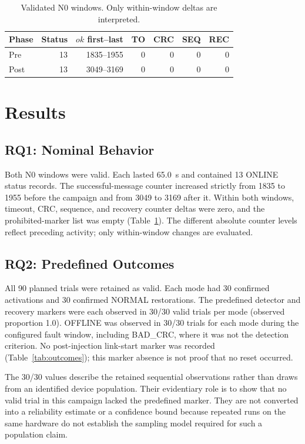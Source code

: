 \documentclass[conference]{IEEEtran}
\begin{document}
\begin{table}[t]
\caption{Validated N0 windows. Only within-window deltas are interpreted.}
\label{tab:n0}
\centering
\footnotesize
\begin{tabular}{lrrrrrr}
\toprule
Phase & Status & $ok$ first--last & TO & CRC & SEQ & REC \\
\midrule
Pre  & 13 & 1835--1955 & 0 & 0 & 0 & 0 \\
Post & 13 & 3049--3169 & 0 & 0 & 0 & 0 \\
\bottomrule
\end{tabular}
\end{table}

\section{Results}

\subsection{RQ1: Nominal Behavior}

Both N0 windows were valid. Each lasted 65.0~s and contained 13 ONLINE status records. The successful-message counter increased strictly from 1835 to 1955 before the campaign and from 3049 to 3169 after it. Within both windows, timeout, CRC, sequence, and recovery counter deltas were zero, and the prohibited-marker list was empty (Table~\ref{tab:n0}). The different absolute counter levels reflect preceding activity; only within-window changes are evaluated.

\subsection{RQ2: Predefined Outcomes}

All 90 planned trials were retained as valid. Each mode had 30 confirmed activations and 30 confirmed NORMAL restorations. The predefined detector and recovery markers were each observed in 30/30 valid trials per mode (observed proportion 1.0). OFFLINE was observed in 30/30 trials for each mode during the configured fault window, including BAD\_CRC, where it was not the detection criterion. No post-injection link-start marker was recorded (Table~\ref{tab:outcomes}); this marker absence is not proof that no reset occurred.

The 30/30 values describe the retained sequential observations rather than draws from an identified device population. Their evidentiary role is to show that no valid trial in this campaign lacked the predefined marker. They are not converted into a reliability estimate or a confidence bound because repeated runs on the same hardware do not establish the sampling model required for such a population claim.
\end{document}
